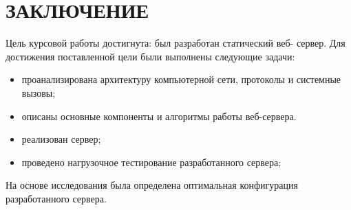 \chapter*{ЗАКЛЮЧЕНИЕ}
Цель курсовой работы достигнута: был разработан статический веб-
сервер. Для достижения поставленной цели были выполнены следующие
задачи:
\begin{itemize}
	\item проанализирована архитектуру компьютерной сети, протоколы и системные вызовы; 
	\item описаны основные компоненты и алгоритмы работы веб-сервера.
	\item реализован сервер;
	\item проведено нагрузочное тестирование разработанного сервера;
\end{itemize}
На основе исследования была определена оптимальная конфигурация разработанного сервера.
